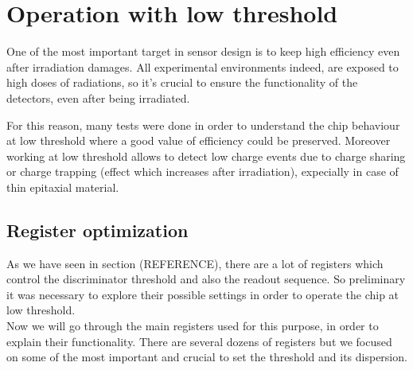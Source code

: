 \section{Operation with low threshold}

One of the most important target in sensor design is to keep high efficiency even after irradiation damages. All experimental environments indeed, are exposed to high doses of radiations, so it's crucial to ensure the functionality of the detectors, even after being irradiated.

For this reason, many tests were done in order to understand the chip behaviour at low threshold where a good value of efficiency could be preserved.
Moreover working at low threshold allows to detect low charge events due to charge sharing or charge trapping (effect which increases after irradiation), expecially in case of thin epitaxial material. 


\subsection{Register optimization}

As we have seen in section (REFERENCE), there are a lot of registers which control the discriminator threshold and also the readout sequence. So preliminary it was necessary to explore their possible settings in order to operate the chip at low threshold.\\

Now we will go through the main registers used for this purpose, in order to explain their functionality. There are several dozens of registers but we focused on some of the most important and crucial to set the threshold and its dispersion.

